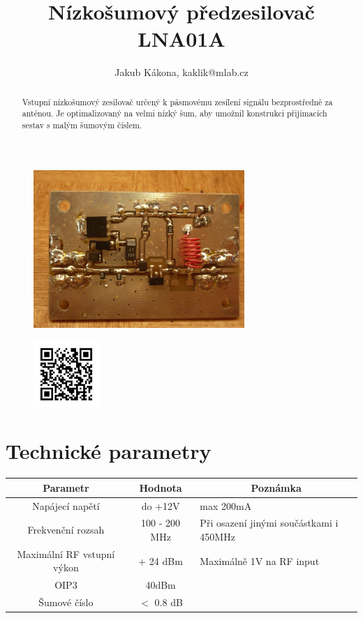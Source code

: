 \documentclass[12pt,a4paper,oneside]{article}
\begin{document}
\title{Nízkošumový předzesilovač LNA01A}
\author{Jakub Kákona, kaklik@mlab.cz}
\maketitle

\thispagestyle{empty}
\begin{abstract}
Vstupní nízkošumový zesilovač určený k pásmovému zesílení signálu bezprostředně za anténou. Je optimalizovaný na velmi nízký šum, aby umožnil konstrukci přijímacích sestav s malým šumovým číslem.  
\end{abstract}

\begin{figure} [htbp]
\begin{center}
\includegraphics [width=80mm] {../img/LNA01A_bottom_big.jpg} 
\end{center}
\end{figure}

\begin{figure} [b]
\includegraphics [width=25mm] {../img/LNA01A_QRcode.png} 
\end{figure}

\newpage
\tableofcontents


\section{Technické parametry}
\begin{table}[htbp]
\begin{center}
\begin{tabular}{|c|c|p{4.7cm}|}
\hline
\multicolumn{1}{|c|}{Parametr} & \multicolumn{1}{|c|}{Hodnota} & \multicolumn{1}{|c|}{Poznámka} \\ \hline
Napájecí napětí & do +12V &  max 200mA \\ \hline
Frekvenční rozsah  & 100 - 200 MHz & Při osazení jinými součástkami i 450MHz \\ \hline
Maximální RF vstupní výkon  & + 24 dBm & Maximálně 1V na RF input \\ \hline
OIP3  & 40dBm &  \\ \hline
Šumové číslo  & $<$ 0.8 dB & \\ \hline
\end{tabular}
\end{center}
\end{table}
\end{document}
